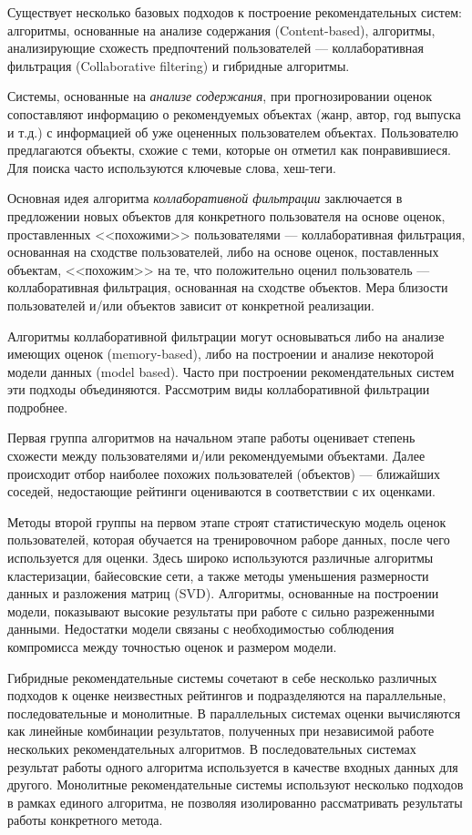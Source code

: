 \documentclass[a4paper, 12pt]{article} %
\begin{document}
\par
Существует несколько базовых подходов к построение рекомендательных систем: алгоритмы, основанные на анализе содержания (Content-based), алгоритмы, анализирующие схожесть предпочтений пользователей --- коллаборативная фильтрация (Collaborative filtering) и гибридные алгоритмы. 
\par
Системы, основанные на \textit{анализе содержания}, при прогнозировании оценок сопоставляют информацию о рекомендуемых объектах (жанр, автор, год выпуска и т.д.) с информацией об уже оцененных пользователем объектах. Пользователю предлагаются объекты, схожие с теми, которые он отметил как понравившиеся. Для поиска часто используются ключевые слова, хеш-теги. 
\par
Основная идея алгоритма \textit{коллаборативной фильтрации} заключается в предложении новых объектов для конкретного пользователя на основе оценок, проставленных <<похожими>> пользователями --- коллаборативная фильтрация, основанная на сходстве пользователей, либо на основе оценок, поставленных объектам, <<похожим>> на те, что положительно оценил пользователь --- коллаборативная фильтрация, основанная на сходстве объектов. Мера близости пользователей и/или объектов зависит от конкретной реализации. 
\par
Алгоритмы коллаборативной фильтрации могут основываться либо на анализе имеющих оценок (memory-based), либо на построении и анализе некоторой модели данных (model based). Часто при построении рекомендательных систем эти подходы объединяются. Рассмотрим виды коллаборативной фильтрации подробнее.
\par
Первая группа алгоритмов на начальном этапе работы оценивает степень схожести между пользователями и/или рекомендуемыми объектами. Далее происходит отбор наиболее похожих пользователей (объектов) --- ближайших соседей, недостающие рейтинги оцениваются в соответствии с их оценками. 
\par
Методы второй группы на первом этапе строят статистическую модель оценок пользователей, которая обучается на тренировочном раборе данных, после чего используется для оценки. Здесь широко используются различные алгоритмы кластеризации, байесовские сети, а также методы уменьшения размерности данных и разложения матриц (SVD). Алгоритмы, основанные на построении  модели, показывают высокие результаты при работе с сильно разреженными данными. Недостатки модели связаны с необходимостью соблюдения компромисса между точностью оценок и размером модели.

\par
Гибридные рекомендательные системы сочетают в себе несколько различных подходов к оценке неизвестных рейтингов и подразделяются на параллельные, последовательные и монолитные. В параллельных системах оценки вычисляются как линейные комбинации результатов, полученных при независимой работе нескольких рекомендательных алгоритмов. В последовательных системах результат работы одного алгоритма используется в качестве входных данных для другого. Монолитные рекомендательные  системы используют несколько подходов в рамках единого алгоритма, не позволяя изолированно рассматривать результаты работы конкретного метода.
\end{document}

